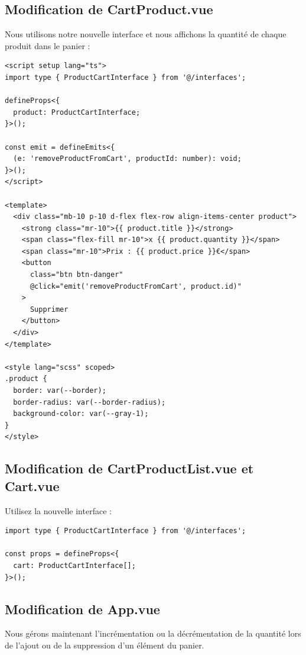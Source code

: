 \documentclass{article}
\begin{document}
\subsection{Modification de {\color{monOrange}CartProduct.vue}}
Nous utilisons notre nouvelle interface et nous affichons la quantité de chaque produit dans le panier :
\begin{verbatim}
<script setup lang="ts">
import type { ProductCartInterface } from '@/interfaces';

defineProps<{
  product: ProductCartInterface;
}>();

const emit = defineEmits<{
  (e: 'removeProductFromCart', productId: number): void;
}>();
</script>

<template>
  <div class="mb-10 p-10 d-flex flex-row align-items-center product">
    <strong class="mr-10">{{ product.title }}</strong>
    <span class="flex-fill mr-10">x {{ product.quantity }}</span>
    <span class="mr-10">Prix : {{ product.price }}€</span>
    <button
      class="btn btn-danger"
      @click="emit('removeProductFromCart', product.id)"
    >
      Supprimer
    </button>
  </div>
</template>

<style lang="scss" scoped>
.product {
  border: var(--border);
  border-radius: var(--border-radius);
  background-color: var(--gray-1);
}
</style>
\end{verbatim}
\subsection{Modification de {\color{monOrange}CartProductList.vue} et {\color{monOrange}Cart.vue}}
Utilisez la nouvelle interface :
\begin{verbatim}
import type { ProductCartInterface } from '@/interfaces';

const props = defineProps<{
  cart: ProductCartInterface[];
}>();
\end{verbatim}
\subsection{Modification de {\color{monOrange}App.vue}}
Nous gérons maintenant l'incrémentation ou la décrémentation de la quantité lors de l'ajout ou de la suppression d'un élément du panier.
\end{document}

